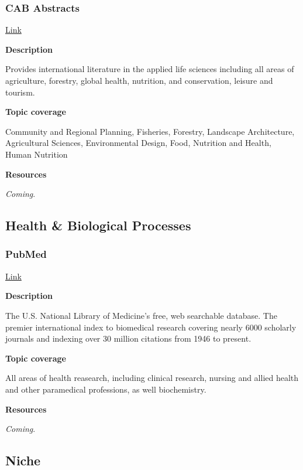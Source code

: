 \documentclass[
]{book}
\begin{document}
\hypertarget{cab-abstracts}{%
\subsubsection{CAB Abstracts}\label{cab-abstracts}}

\href{https://resources.library.ubc.ca/page.php?details=cab-direct\&id=107}{Link}

\textbf{Description}

Provides international literature in the applied life sciences including all areas of agriculture, forestry, global health, nutrition, and conservation, leisure and tourism.

\textbf{Topic coverage}

Community and Regional Planning, Fisheries, Forestry, Landscape Architecture, Agricultural Sciences, Environmental Design, Food, Nutrition and Health, Human Nutrition

\textbf{Resources}

\emph{Coming}.

\hypertarget{health-biological-processes}{%
\subsection{Health \& Biological Processes}\label{health-biological-processes}}

\hypertarget{pubmed}{%
\subsubsection{PubMed}\label{pubmed}}

\href{https://resources.library.ubc.ca/page.php?details=pubmed\&id=166}{Link}

\textbf{Description}

The U.S. National Library of Medicine's free, web searchable database. The premier international index to biomedical research covering nearly 6000 scholarly journals and indexing over 30 million citations from 1946 to present.

\textbf{Topic coverage}

All areas of health reasearch, including clinical research, nursing and allied health and other paramedical professions, as well biochemistry.

\textbf{Resources}

\emph{Coming}.

\hypertarget{niche}{%
\subsection{Niche}\label{niche}}
\end{document}
